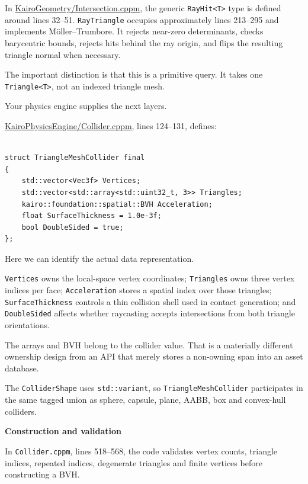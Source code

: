 In \href{https://github.com/swayam8624/KairoGeometry/blob/master/Intersection.cppm?utm_source=chatgpt.com}{KairoGeometry/Intersection.cppm}, the generic \texttt{RayHit\textless{}T\textgreater{}} type is defined around lines 32--51. \texttt{RayTriangle} occupies approximately lines 213--295 and implements Möller--Trumbore. It rejects near-zero determinants, checks barycentric bounds, rejects hits behind the ray origin, and flips the resulting triangle normal when necessary.

The important distinction is that this is a primitive query. It takes one \texttt{Triangle\textless{}T\textgreater{}}, not an indexed triangle mesh.

Your physics engine supplies the next layers.

\href{https://github.com/swayam8624/KairoPhysicsEngine/blob/main/Collider.cppm?utm_source=chatgpt.com}{KairoPhysicsEngine/Collider.cppm}, lines 124--131, defines:

\begin{verbatim}

struct TriangleMeshCollider final
{
    std::vector<Vec3f> Vertices;
    std::vector<std::array<std::uint32_t, 3>> Triangles;
    kairo::foundation::spatial::BVH Acceleration;
    float SurfaceThickness = 1.0e-3f;
    bool DoubleSided = true;
};
\end{verbatim}

Here we can identify the actual data representation.

\texttt{Vertices} owns the local-space vertex coordinates; \texttt{Triangles} owns three vertex indices per face; \texttt{Acceleration} stores a spatial index over those triangles; \texttt{SurfaceThickness} controls a thin collision shell used in contact generation; and \texttt{DoubleSided} affects whether raycasting accepts intersections from both triangle orientations.

The arrays and BVH belong to the collider value. That is a materially different ownership design from an API that merely stores a non-owning span into an asset database.

The \texttt{ColliderShape} uses \texttt{std::variant}, so \texttt{TriangleMeshCollider} participates in the same tagged union as sphere, capsule, plane, AABB, box and convex-hull colliders.

\textbf{Construction and validation}

In \texttt{Collider.cppm}, lines 518--568, the code validates vertex counts, triangle indices, repeated indices, degenerate triangles and finite vertices before constructing a BVH.

